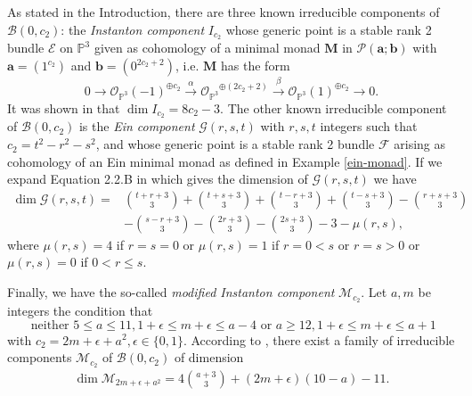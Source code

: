 \documentclass[twoside,reqno]{amsart}
\theoremstyle{plain}
\newcommand{\E}{\mathcal{E}}
\begin{document}
 
As stated in the Introduction, there are three known irreducible components of $\mathcal{B}(0,c_2)$: the \textit{Instanton component} $I_{c_2}$ whose generic 
point is a stable rank 2 bundle $\E$ on $\mathbb{P}^3$ given as cohomology of a minimal monad $\mathbf{M}$ in $\mathcal{P}(\boldsymbol{a}; \boldsymbol{b})$ with $\boldsymbol{a}=(1^{c_2})$ and $\boldsymbol{b}=(0^{2c_2+2})$, i.e. $\mathbf{M}$ has the form  
$$0\longrightarrow\mathcal{O}_{\mathbb{P}^3}(-1)^{\oplus c_2}\stackrel{\alpha}{\longrightarrow}{\mathcal{O}_{\mathbb{P}^3}}^{\oplus (2c_2+2)}\stackrel{\beta}{\longrightarrow}\mathcal{O}_{\mathbb{P}^3}(1)^{\oplus c_2}\longrightarrow0.$$
It was shown in \cite{H78} that $\dim I_{c_2}=8c_2-3$. The other known irreducible component of $\mathcal{B}(0,c_2)$ is the \textit{Ein component} 
$\mathcal{G}(r,s,t)$ with $r, s,t$ integers 
such that $c_2=t^2-r^2-s^2$, and whose generic point is a stable rank 2 bundle $\mathcal{F}$ arising as 
cohomology of an Ein minimal monad as defined in Example \ref{ein-monad}. If we expand Equation 2.2.B in \cite{Ein88} which 
gives the dimension of $\mathcal{G}(r,s,t)$ we have
\begin{eqnarray}\label{ein-dim}
\dim \mathcal{G}(r,s,t)=&\binom{t+r+3}{3}+\binom{t+s+3}{3}+\binom{t-r+3}{3}+\binom{t-s+3}{3}-\binom{r+s+3}{3}\nonumber\\
 &-\binom{s-r+3}{3}-\binom{2r+3}{3}-\binom{2s+3}{3}-3-\mu(r,s),
\end{eqnarray}
where $\mu(r,s)=4$ if $r=s=0$ or $\mu(r,s)=1$ if $r=0<s$ or $r=s>0$ or $\mu(r,s)=0$ if $0<r\leq s$.


Finally, we have the so-called \textit{modified Instanton component} $\mathcal{M}_{c_2}$. Let $a, m$ be integers the condition that 
$$\mbox{ neither } 5\leq a\leq11, 1+\epsilon\leq m+\epsilon\leq a-4 \mbox{ or } a\geq12, 1+\epsilon\leq m+\epsilon\leq a+1$$
with $c_2=2m+\epsilon+a^2, \epsilon\in\{0,1\}$. According to \cite[Theorem 1]{tikhomirov2019}, there exist a family of irreducible components $\mathcal{M}_{c_2}$ of $\mathcal{B}(0,c_2)$ of dimension 
\begin{eqnarray*}
\dim \mathcal{M}_{2m+\epsilon+a^2}=4\binom{a+3}{3}+(2m+\epsilon)(10-a)-11.
\end{eqnarray*}
\end{document}

